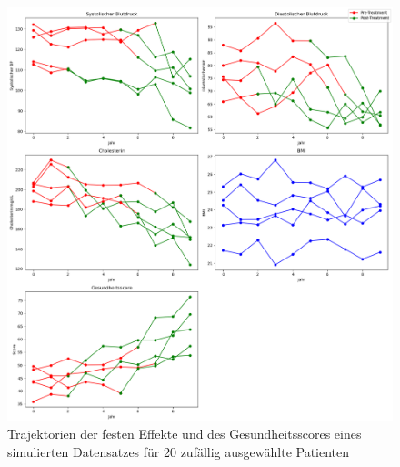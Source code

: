 \documentclass[%
thesis=student,%
coverpage=false,%
titlepage=false,%
headmarks=true, %
german,%
font=libertine, %
math=newpxtx, %
BCOR=5mm,%
coverBCOR=11mm%
]{tumbook}
\theoremstyle{break}
\begin{document}
\begin{figure}[H]
	\centering
	\includegraphics[width=\linewidth]{plots/Herzgesundheit_Datensatz.png}
	\caption{Trajektorien der festen Effekte und des Gesundheitsscores eines simulierten Datensatzes für 20 zufällig ausgewählte Patienten}
	\label{fig:sample_image}
\end{figure}
\end{document}
